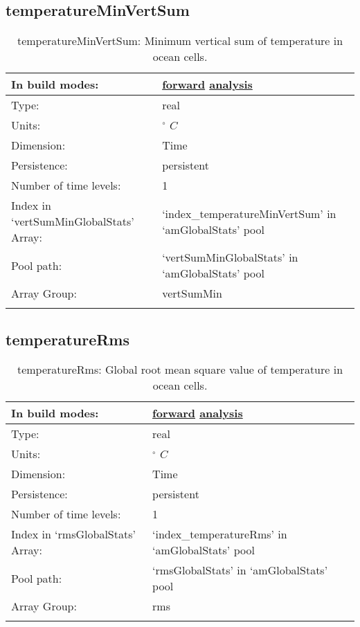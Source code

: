 \subsection[temperatureMinVertSum]{temperatureMinVertSum}
\label{subsec:var_sec_amGlobalStats_temperatureMinVertSum}
\begin{center}
\begin{longtable}{| p{2.0in} | p{4.0in} |}
        \hline 
        In build modes: & \hyperref[subsec:forward_var_tab_amGlobalStats]{forward} \hyperref[subsec:analysis_var_tab_amGlobalStats]{analysis} \\
        \hline 
        Type: & real \\
        \hline 
        Units: & $^\circ$ $C$ \\
        \hline 
        Dimension: & Time \\
        \hline 
        Persistence: & persistent \\
        \hline 
        Number of time levels: & 1 \\
        \hline 
		 Index in `vertSumMinGlobalStats' Array: & `index\_temperatureMinVertSum' in `amGlobalStats' pool \\
		 \hline 
            Pool path: & `vertSumMinGlobalStats' in `amGlobalStats' pool \\
		 \hline 
		 Array Group: & vertSumMin \\
		 \hline 
    \caption{temperatureMinVertSum: Minimum vertical sum of temperature in ocean cells.}
\end{longtable}
\end{center}
\subsection[temperatureRms]{temperatureRms}
\label{subsec:var_sec_amGlobalStats_temperatureRms}
\begin{center}
\begin{longtable}{| p{2.0in} | p{4.0in} |}
        \hline 
        In build modes: & \hyperref[subsec:forward_var_tab_amGlobalStats]{forward} \hyperref[subsec:analysis_var_tab_amGlobalStats]{analysis} \\
        \hline 
        Type: & real \\
        \hline 
        Units: & $^\circ$ $C$ \\
        \hline 
        Dimension: & Time \\
        \hline 
        Persistence: & persistent \\
        \hline 
        Number of time levels: & 1 \\
        \hline 
		 Index in `rmsGlobalStats' Array: & `index\_temperatureRms' in `amGlobalStats' pool \\
		 \hline 
            Pool path: & `rmsGlobalStats' in `amGlobalStats' pool \\
		 \hline 
		 Array Group: & rms \\
		 \hline 
    \caption{temperatureRms: Global root mean square value of temperature in ocean cells.}
\end{longtable}
\end{center}
